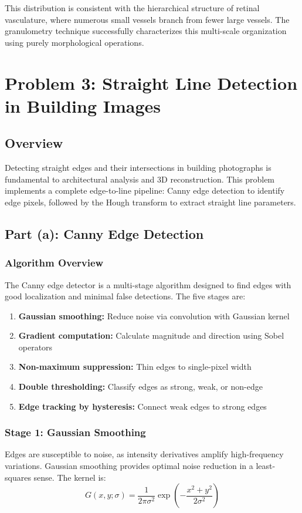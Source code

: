 \documentclass[11pt,a4paper]{article}
\begin{document}
This distribution is consistent with the hierarchical structure of retinal vasculature, where numerous small vessels branch from fewer large vessels. The granulometry technique successfully characterizes this multi-scale organization using purely morphological operations.

\newpage
\section{Problem 3: Straight Line Detection in Building Images}

\subsection{Overview}
Detecting straight edges and their intersections in building photographs is fundamental to architectural analysis and 3D reconstruction. This problem implements a complete edge-to-line pipeline: Canny edge detection to identify edge pixels, followed by the Hough transform to extract straight line parameters.

\subsection{Part (a): Canny Edge Detection}

\subsubsection{Algorithm Overview}
The Canny edge detector is a multi-stage algorithm designed to find edges with good localization and minimal false detections. The five stages are:

\begin{enumerate}
    \item \textbf{Gaussian smoothing:} Reduce noise via convolution with Gaussian kernel
    \item \textbf{Gradient computation:} Calculate magnitude and direction using Sobel operators
    \item \textbf{Non-maximum suppression:} Thin edges to single-pixel width
    \item \textbf{Double thresholding:} Classify edges as strong, weak, or non-edge
    \item \textbf{Edge tracking by hysteresis:} Connect weak edges to strong edges
\end{enumerate}

\subsubsection{Stage 1: Gaussian Smoothing}
Edges are susceptible to noise, as intensity derivatives amplify high-frequency variations. Gaussian smoothing provides optimal noise reduction in a least-squares sense. The kernel is:
$$G(x,y;\sigma) = \frac{1}{2\pi\sigma^2}\exp\left(-\frac{x^2+y^2}{2\sigma^2}\right)$$
\end{document}
